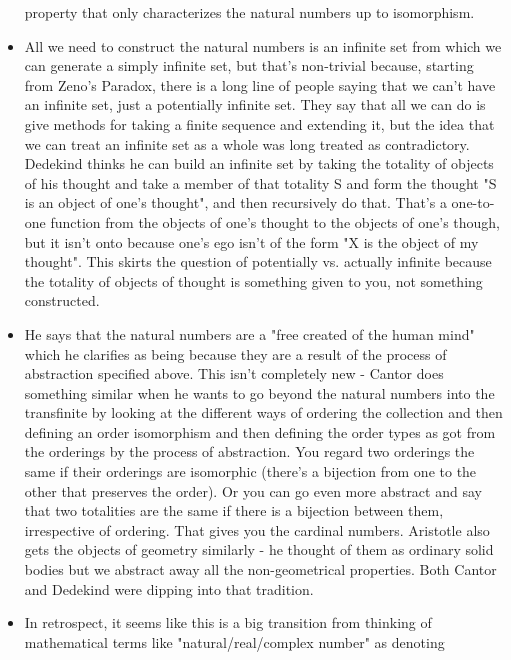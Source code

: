 \documentclass[12pt]{article}
\theoremstyle{definition}
\begin{document}
\begin{itemize}
        property that only characterizes the natural numbers up to isomorphism.
    \item
        All we need to construct the natural numbers is an infinite set from
        which we can generate a simply infinite set, but that's non-trivial
        because, starting from Zeno's Paradox, there is a long line of people
        saying that we can't have an infinite set, just a potentially infinite
        set. They say that all we can do is give methods for taking a finite
        sequence and extending it, but the idea that we can treat an infinite
        set as a whole was long treated as contradictory. Dedekind thinks he
        can build an infinite set by taking the totality of objects of his
        thought and take a member of that totality S and form the thought "S is
        an object of one's thought", and then recursively do that. That's a
        one-to-one function from the objects of one's thought to the objects of
        one's though, but it isn't onto because one's ego isn't of the form "X
        is the object of my thought". This skirts the question of potentially
        vs. actually infinite because the totality of objects of thought is
        something given to you, not something constructed.
    \item 
        He says that the natural numbers are a "free created of the human mind"
        which he clarifies as being because they are a result of the process of
        abstraction specified above. This isn't completely new - Cantor does
        something similar when he wants to go beyond the natural numbers into
        the transfinite by looking at the different ways of ordering the
        collection and then defining an order isomorphism and then defining the
        order types as got from the orderings by the process of abstraction.
        You regard two orderings the same if their orderings are isomorphic
        (there's a bijection from one to the other that preserves the order).
        Or you can go even more abstract and say that two totalities are the
        same if there is a bijection between them, irrespective of ordering.
        That gives you the cardinal numbers. Aristotle also gets the objects of
        geometry similarly - he thought of them as ordinary solid bodies but we
        abstract away all the non-geometrical properties. Both Cantor and
        Dedekind were dipping into that tradition.
    \item
        In retrospect, it seems like this is a big transition from thinking of
        mathematical terms like "natural/real/complex number" as denoting

\end{itemize}
\end{document}
